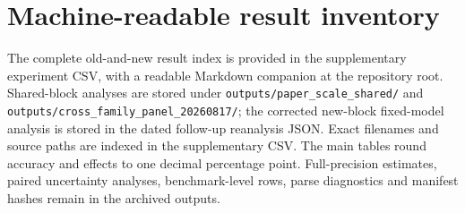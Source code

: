 \documentclass[11pt]{article}
\begin{document}
\section{Machine-readable result inventory}

The complete old-and-new result index is provided in the supplementary
experiment CSV, with a readable Markdown companion at the repository root.
Shared-block analyses are stored under \texttt{outputs/paper\_scale\_shared/}
and \texttt{outputs/cross\_family\_panel\_20260817/}; the corrected new-block
fixed-model analysis is stored in the dated follow-up reanalysis JSON. Exact
filenames and source paths are indexed in the supplementary CSV. The main
tables round accuracy and effects to one decimal percentage point. Full-precision
estimates, paired uncertainty analyses, benchmark-level rows, parse diagnostics
and manifest hashes remain in the archived outputs.
\end{document}
